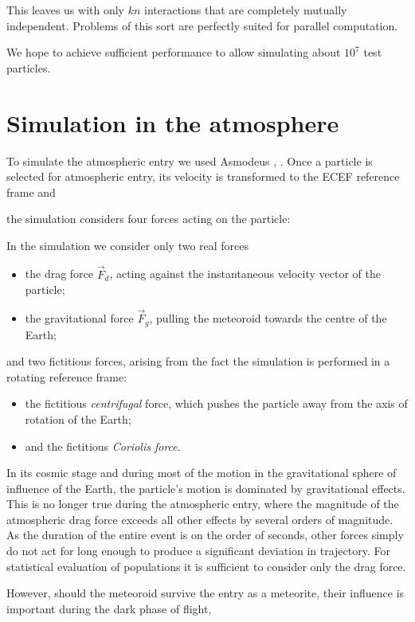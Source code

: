             This leaves us with only $kn$ interactions that are completely mutually independent.
            Problems of this sort are perfectly suited for parallel computation.

            We hope to achieve sufficient performance to allow simulating about $10^7$ test particles.

\section{Simulation in the atmosphere} \label{aa}
    To simulate the atmospheric entry we used Asmodeus \citep{balaz-thesis}, \citep{balaz+2020}.
    Once a particle is selected for atmospheric entry, its velocity is transformed to the ECEF reference frame
    and 

        the simulation considers four forces acting on the particle:

    In the simulation we consider only two real forces
    \begin{itemize}
        \item the drag force $\vec{F}_{d}$, acting against the instantaneous velocity vector of the particle;
        \item the gravitational force $\vec{F}_{g}$, pulling the meteoroid towards the centre of the Earth;
    \end{itemize}

    
    and two fictitious forces, arising from the fact the simulation is performed in a rotating reference frame:
    \begin{itemize}
        \item the fictitious \emph{centrifugal} force, which pushes the particle away from the axis of rotation of the Earth;
        \item and the fictitious \emph{Coriolis force}.
    \end{itemize}

    In its cosmic stage and during most of the motion in the gravitational sphere of influence of the Earth,
    the particle's motion is dominated by gravitational effects. This is no longer true during the atmospheric entry,
    where the magnitude of the atmospheric drag force exceeds all other effects by several orders of magnitude.
    As the duration of the entire event is on the order of seconds, other forces simply do not act for long enough
    to produce a significant deviation in trajectory. For statistical evaluation of populations it is sufficient
    to consider only the drag force.

    However, should the meteoroid survive the entry as a meteorite,  their influence is important during the dark phase of flight,
